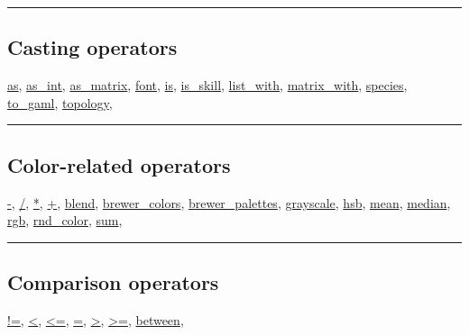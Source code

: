 \documentclass[]{book}
\theoremstyle{definition}
\theoremstyle{definition}
\theoremstyle{definition}
\theoremstyle{remark}
\begin{document}
\begin{center}\rule{0.5\linewidth}{\linethickness}\end{center}

\subsection{Casting operators}\label{casting-operators}

\href{operators-a-to-a.html\#as}{as},
\href{operators-a-to-a.html\#as_int}{as\_int},
\href{operators-a-to-a.html\#as_matrix}{as\_matrix},
\href{operators-d-to-h.html\#font}{font},
\href{operators-i-to-m.html\#is}{is},
\href{operators-i-to-m.html\#is_skill}{is\_skill},
\href{operators-i-to-m.html\#list_with}{list\_with},
\href{operators-i-to-m.html\#matrix_with}{matrix\_with},
\href{operators-s-to-z.html\#species}{species},
\href{operators-s-to-z.html\#to_gaml}{to\_gaml},
\href{operators-s-to-z.html\#topology}{topology},

\begin{center}\rule{0.5\linewidth}{\linethickness}\end{center}

\subsection{Color-related operators}\label{color-related-operators}

\href{operators-a-to-a.html\#-}{-}, \href{operators-a-to-a.html\#/}{/},
\href{operators-a-to-a.html\#*}{*}, \href{operators-a-to-a.html\#+}{+},
\href{operators-b-to-c.html\#blend}{blend},
\href{operators-b-to-c.html\#brewer_colors}{brewer\_colors},
\href{operators-b-to-c.html\#brewer_palettes}{brewer\_palettes},
\href{operators-d-to-h.html\#grayscale}{grayscale},
\href{operators-d-to-h.html\#hsb}{hsb},
\href{operators-i-to-m.html\#mean}{mean},
\href{operators-i-to-m.html\#median}{median},
\href{operators-n-to-r.html\#rgb}{rgb},
\href{operators-n-to-r.html\#rnd_color}{rnd\_color},
\href{operators-s-to-z.html\#sum}{sum},

\begin{center}\rule{0.5\linewidth}{\linethickness}\end{center}

\subsection{Comparison operators}\label{comparison-operators}

\href{operators-a-to-a.html\#!=}{!=},
\href{operators-a-to-a.html\#\%3C}{\textless{}},
\href{operators-a-to-a.html\#\%3C=}{\textless{}=},
\href{operators-a-to-a.html\#=}{=},
\href{operators-a-to-a.html\#\%3E}{\textgreater{}},
\href{operators-a-to-a.html\#\%3E=}{\textgreater{}=},
\href{operators-b-to-c.html\#between}{between},
\end{document}
